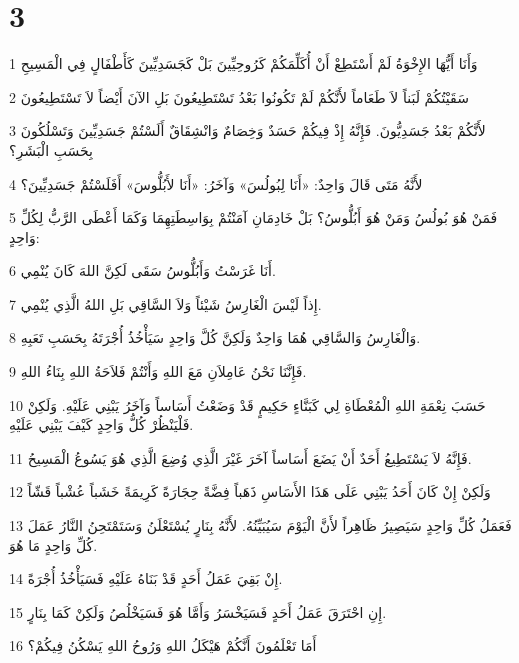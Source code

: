 \chapter{3}

\par 1 وَأَنَا أَيُّهَا الإِخْوَةُ لَمْ أَسْتَطِعْ أَنْ أُكَلِّمَكُمْ كَرُوحِيِّينَ بَلْ كَجَسَدِيِّينَ كَأَطْفَالٍ فِي الْمَسِيحِ
\par 2 سَقَيْتُكُمْ لَبَناً لاَ طَعَاماً لأَنَّكُمْ لَمْ تَكُونُوا بَعْدُ تَسْتَطِيعُونَ بَلِ الآنَ أَيْضاً لاَ تَسْتَطِيعُونَ
\par 3 لأَنَّكُمْ بَعْدُ جَسَدِيُّونَ. فَإِنَّهُ إِذْ فِيكُمْ حَسَدٌ وَخِصَامٌ وَانْشِقَاقٌ أَلَسْتُمْ جَسَدِيِّينَ وَتَسْلُكُونَ بِحَسَبِ الْبَشَرِ؟
\par 4 لأَنَّهُ مَتَى قَالَ وَاحِدٌ: «أَنَا لِبُولُسَ» وَآخَرُ: «أَنَا لأَبُلُّوسَ» أَفَلَسْتُمْ جَسَدِيِّينَ؟
\par 5 فَمَنْ هُوَ بُولُسُ وَمَنْ هُوَ أَبُلُّوسُ؟ بَلْ خَادِمَانِ آمَنْتُمْ بِوَاسِطَتِهِمَا وَكَمَا أَعْطَى الرَّبُّ لِكُلِّ وَاحِدٍ:
\par 6 أَنَا غَرَسْتُ وَأَبُلُّوسُ سَقَى لَكِنَّ اللهَ كَانَ يُنْمِي.
\par 7 إِذاً لَيْسَ الْغَارِسُ شَيْئاً وَلاَ السَّاقِي بَلِ اللهُ الَّذِي يُنْمِي.
\par 8 وَالْغَارِسُ وَالسَّاقِي هُمَا وَاحِدٌ وَلَكِنَّ كُلَّ وَاحِدٍ سَيَأْخُذُ أُجْرَتَهُ بِحَسَبِ تَعَبِهِ.
\par 9 فَإِنَّنَا نَحْنُ عَامِلاَنِ مَعَ اللهِ وَأَنْتُمْ فَلاَحَةُ اللهِ بِنَاءُ اللهِ.
\par 10 حَسَبَ نِعْمَةِ اللهِ الْمُعْطَاةِ لِي كَبَنَّاءٍ حَكِيمٍ قَدْ وَضَعْتُ أَسَاساً وَآخَرُ يَبْنِي عَلَيْهِ. وَلَكِنْ فَلْيَنْظُرْ كُلُّ وَاحِدٍ كَيْفَ يَبْنِي عَلَيْهِ.
\par 11 فَإِنَّهُ لاَ يَسْتَطِيعُ أَحَدٌ أَنْ يَضَعَ أَسَاساً آخَرَ غَيْرَ الَّذِي وُضِعَ الَّذِي هُوَ يَسُوعُ الْمَسِيحُ.
\par 12 وَلَكِنْ إِنْ كَانَ أَحَدُ يَبْنِي عَلَى هَذَا الأَسَاسِ ذَهَباً فِضَّةً حِجَارَةً كَرِيمَةً خَشَباً عُشْباً قَشّاً
\par 13 فَعَمَلُ كُلِّ وَاحِدٍ سَيَصِيرُ ظَاهِراً لأَنَّ الْيَوْمَ سَيُبَيِّنُهُ. لأَنَّهُ بِنَارٍ يُسْتَعْلَنُ وَسَتَمْتَحِنُ النَّارُ عَمَلَ كُلِّ وَاحِدٍ مَا هُوَ.
\par 14 إِنْ بَقِيَ عَمَلُ أَحَدٍ قَدْ بَنَاهُ عَلَيْهِ فَسَيَأْخُذُ أُجْرَةً.
\par 15 إِنِ احْتَرَقَ عَمَلُ أَحَدٍ فَسَيَخْسَرُ وَأَمَّا هُوَ فَسَيَخْلُصُ وَلَكِنْ كَمَا بِنَارٍ.
\par 16 أَمَا تَعْلَمُونَ أَنَّكُمْ هَيْكَلُ اللهِ وَرُوحُ اللهِ يَسْكُنُ فِيكُمْ؟
